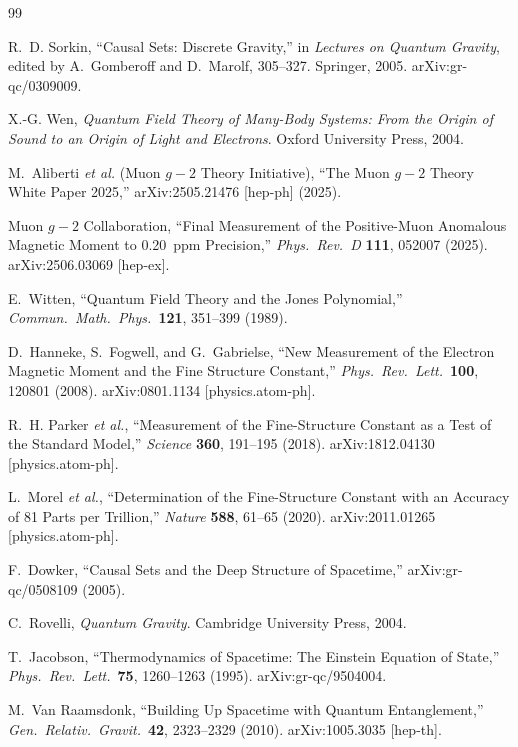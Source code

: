 \documentclass[11pt,a4paper]{article}
\theoremstyle{plain}
\theoremstyle{definition}
\begin{document}
\begin{thebibliography}{99}

R.~D. Sorkin, ``Causal Sets: Discrete Gravity,'' in \textit{Lectures on Quantum Gravity}, edited by A.~Gomberoff and D.~Marolf, 305--327. Springer, 2005. arXiv:gr-qc/0309009.

X.-G. Wen, \textit{Quantum Field Theory of Many-Body Systems: From the Origin of Sound to an Origin of Light and Electrons}. Oxford University Press, 2004.

M.~Aliberti \textit{et al.} (Muon $g-2$ Theory Initiative), ``The Muon $g-2$ Theory White Paper 2025,'' arXiv:2505.21476 [hep-ph] (2025).

Muon $g-2$ Collaboration, ``Final Measurement of the Positive-Muon Anomalous Magnetic Moment to 0.20~ppm Precision,'' \textit{Phys.\ Rev.\ D} \textbf{111}, 052007 (2025). arXiv:2506.03069 [hep-ex].

E.~Witten, ``Quantum Field Theory and the Jones Polynomial,'' \textit{Commun.\ Math.\ Phys.}\ \textbf{121}, 351--399 (1989).

D.~Hanneke, S.~Fogwell, and G.~Gabrielse, ``New Measurement of the Electron Magnetic Moment and the Fine Structure Constant,'' \textit{Phys.\ Rev.\ Lett.}\ \textbf{100}, 120801 (2008). arXiv:0801.1134 [physics.atom-ph].

R.~H. Parker \textit{et al.}, ``Measurement of the Fine-Structure Constant as a Test of the Standard Model,'' \textit{Science} \textbf{360}, 191--195 (2018). arXiv:1812.04130 [physics.atom-ph].

L.~Morel \textit{et al.}, ``Determination of the Fine-Structure Constant with an Accuracy of 81 Parts per Trillion,'' \textit{Nature} \textbf{588}, 61--65 (2020). arXiv:2011.01265 [physics.atom-ph].

F.~Dowker, ``Causal Sets and the Deep Structure of Spacetime,'' arXiv:gr-qc/0508109 (2005).

C.~Rovelli, \textit{Quantum Gravity}. Cambridge University Press, 2004.

T.~Jacobson, ``Thermodynamics of Spacetime: The Einstein Equation of State,'' \textit{Phys.\ Rev.\ Lett.}\ \textbf{75}, 1260--1263 (1995). arXiv:gr-qc/9504004.

M.~Van Raamsdonk, ``Building Up Spacetime with Quantum Entanglement,'' \textit{Gen.\ Relativ.\ Gravit.}\ \textbf{42}, 2323--2329 (2010). arXiv:1005.3035 [hep-th].


\end{thebibliography}
\end{document}
